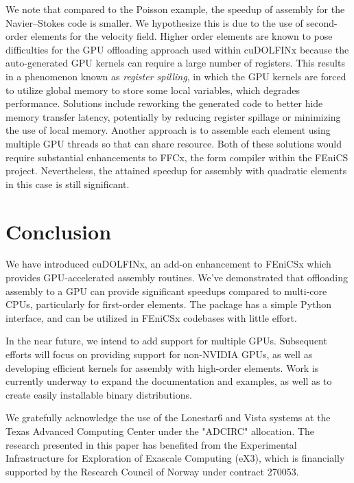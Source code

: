 We note that compared to the Poisson example, the speedup of assembly for the Navier--Stokes code is smaller. We hypothesize this is due to the use of second-order elements for the velocity field. Higher order elements are known to pose difficulties for the GPU offloading approach used within cuDOLFINx because the auto-generated GPU kernels can require a large number of registers. This results in a phenomenon known as \textit{register spilling}, in which the GPU kernels are forced to utilize global memory to store some local variables, which degrades performance. Solutions include reworking the generated code to better hide memory transfer latency, potentially by reducing register spillage or minimizing the use of local memory. Another approach is to assemble each element using multiple GPU threads so that can share resource. Both of these solutions would require substantial enhancements to FFCx, the form compiler within the FEniCS project. Nevertheless, the attained speedup for assembly with quadratic elements in this case is still significant.

\section*{Conclusion}
We have introduced cuDOLFINx, an add-on enhancement to FEniCSx which provides GPU-accelerated assembly routines. We've demonstrated that offloading assembly to a GPU can provide significant speedups compared to multi-core CPUs, particularly for first-order elements. The package has a simple Python interface, and can be utilized in FEniCSx codebases with little effort.

In the near future, we intend to add support for multiple GPUs. Subsequent efforts will focus on providing support for non-NVIDIA GPUs, as well as developing efficient kernels for assembly with high-order elements. Work is currently underway to expand the documentation and examples, as well as to create easily installable binary distributions.



\begin{acknowledgement}
  We gratefully acknowledge the use of the Lonestar6 and Vista systems at the Texas Advanced Computing Center under the "ADCIRC" allocation.
  The research presented in this paper has benefited from the Experimental Infrastructure for Exploration of Exascale Computing (eX3), which is financially supported by the Research Council of Norway under contract 270053.
\end{acknowledgement}



